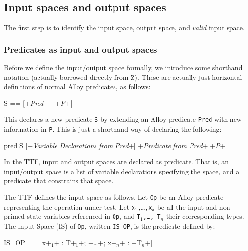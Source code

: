 \subsection{Input spaces and output spaces}

The first step is to identify the input space, output space, and \emph{valid} input space.

\subsubsection*{Predicates as input and output spaces}

Before we define the input/output space formally, we introduce some shorthand notation (actually borrowed directly from Z). These are actually just horizontal definitions of normal Alloy predicates, as follows:

\lstset{aboveskip=3mm}
\begin{alloy}[escapeinside={++}]
 S == [+\emph{Pred}+ | +\emph{P}+]
\end{alloy}

This declares a new predicate \texttt{S} by extending an Alloy predicate \texttt{Pred} with new information in \texttt{P}. This is just a shorthand way of declaring the following:

\lstset{aboveskip=3mm}
\begin{alloy}[escapeinside={++}]
 pred S [+\emph{Variable Declarations from Pred}+] {
   +\emph{Predicate from Pred}+
   +\emph{P}+
 }
\end{alloy}

In the TTF, input and output spaces are declared as predicate. That is, an input/output space is a list of variable declarations specifying the space, and a predicate that constrains that space.

\begin{definition}
The TTF defines the input space as follows. Let \texttt{Op} be an Alloy predicate representing the operation under test. Let \texttt{x$_1$,\ldots,x$_n$} be all the input and non-primed state variables referenced in \texttt{Op}, and \texttt{T$_1$,\ldots, T$_n$} their corresponding types. The Input Space (IS) of \texttt{Op}, written \texttt{IS\_OP}, is the  predicate defined by:

\lstset{aboveskip=3mm}
\lstset{language=}
\begin{alloy}[escapeinside={++}]
 IS_OP == [x+$_1$+ : T+$_1$+; +\ldots+; x+$_n$+ : +T$_n$+]
\end{alloy}
\end{definition}



